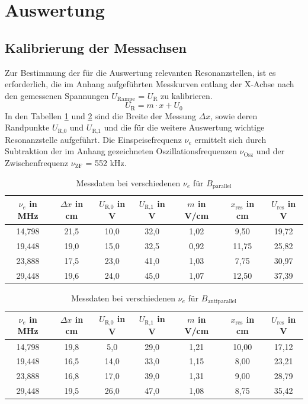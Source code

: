 \section{Auswertung}
\subsection{Kalibrierung der Messachsen}
\label{sec_Kalib}
Zur Bestimmung der für die Auswertung relevanten Resonanzstellen, ist es erforderlich, die im Anhang aufgeführten Messkurven entlang der X-Achse
nach den gemessenen Spannungen $U_\text{Rampe}$ = $U_\text{R}$ zu kalibrieren. 
\begin{equation}
 U_\text{R} = m\cdot x + U_0
\end{equation}
In den Tabellen \ref{tab_nueBpar} und \ref{tab_nueBantipar} sind die Breite der Messung $\Delta x$, sowie deren Randpunkte $U_\text{R,0}$ und 
$U_\text{R,1}$ und die für die weitere Auswertung wichtige Resonanzstelle aufgeführt. Die Einspeisefrequenz $\nu_e$ ermittelt sich durch Subtraktion
der im Anhang gezeichneten Oszillationsfrequenzen $\nu_\text{Osz}$ und der Zwischenfrequenz $\nu_\text{ZF}$ = 552 kHz.

\begin{table}[H]
 \begin{tabular}{c|c|c|c||c|c|c}
  $\nu_e$ in MHz & $\Delta x$ in cm & $U_\text{R,0}$ in V & $U_\text{R,1} $ in V & $m$ in V/cm & $x_{\text{res}}$ in cm & $U_\text{res}$ in V \\
 \hline
14,798&	21,5&	10,0&	32,0&	1,02&	9,50&	19,72 \\
19,448	&19,0&	15,0&	32,5&	0,92&	11,75&	25,82\\
23,888&	17,5&	23,0&	41,0&	1,03&	7,75&	30,97\\
29,448&	19,6&	24,0&	45,0&	1,07&	12,50&	37,39\\
 \end{tabular}
 \caption{Messdaten bei verschiedenen $\nu_e$ für $B_\text{parallel}$ }
 \label{tab_nueBpar}
\end{table}
\begin{table}[H]
 \begin{tabular}{c|c|c|c||c|c|c}
  $\nu_e$ in MHz & $\Delta x$ in cm & $U_\text{R,0}$ in V & $U_\text{R,1} $ in V & $m$ in V/cm & $x_{\text{res}}$ in cm & $U_\text{res}$ in V \\
 \hline
14,798&	19,8&	5,0&	29,0&	1,21&	10,00&	17,12\\
19,448&	16,5&	14,0&	33,0&	1,15&	8,00&	23,21\\
23,888&	16,8&	17,0&	39,0&	1,31&	9,00&	28,79\\
29,448&	19,5&	26,0&	47,0&	1,08&	8,75&	35,42 \\

 \end{tabular}
 \caption{Messdaten bei verschiedenen $\nu_e$ für $B_\text{antiparallel}$}
 \label{tab_nueBantipar}
\end{table}

